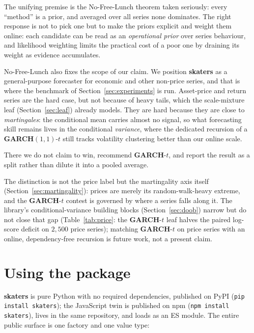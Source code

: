 \documentclass[article]{jss}
\providecommand{\proglang}[1]{\textsf{#1}}
\providecommand{\pkg}[1]{\textbf{#1}}
\providecommand{\code}[1]{\texttt{#1}}
\begin{document}
The unifying premise is the No-Free-Lunch theorem \citep{wolpert1997no} taken
seriously: every ``method'' is a prior, and averaged over all series none
dominates. The right response is not to pick one but to make the priors
explicit and weight them online: each candidate can be read as an
\emph{operational prior} over series behaviour, and likelihood weighting limits the practical cost
of a poor one by draining its weight as evidence accumulates.

No-Free-Lunch also fixes the scope of our claim. We position \pkg{skaters} as a
general-purpose forecaster for economic and other non-price series, and that is
where the benchmark of Section~\ref{sec:experiments} is run. Asset-price and
return series are the hard case, but not because of heavy tails, which the
scale-mixture leaf (Section~\ref{sec:leaf}) already models. They are hard because
they are close to \emph{martingales}: the conditional mean carries almost no
signal, so what forecasting skill remains lives in the conditional \emph{variance},
where the dedicated recursion of a \pkg{GARCH}$(1,1)$-$t$ still tracks volatility
clustering better than our online scale.

There we do not claim to win, recommend
\pkg{GARCH}-$t$, and report the result as a split rather than dilute it into a
pooled average.

The distinction is not the price label but the martingality axis
itself (Section~\ref{sec:martingality}): prices are merely its random-walk-heavy
extreme, and the \pkg{GARCH}-$t$ contest is governed by where a series falls along
it. The library's
conditional-variance building blocks (Section~\ref{sec:doob}) narrow but do not
close that gap (Table~\ref{tab:price}: the \pkg{GARCH}-$t$ leaf halves the
paired log-score deficit on $2{,}500$ price series); matching \pkg{GARCH}-$t$ on price series with an online,
dependency-free recursion is future work, not a present claim.

\section{Using the package} \label{sec:software}

\pkg{skaters} is pure \proglang{Python} with no required dependencies,
published on PyPI (\code{pip install skaters}); the \proglang{JavaScript}
twin is published on npm (\code{npm install skaters}), lives in the same
repository, and loads as an ES module. The entire public surface is one factory
and one value type:
\end{document}

